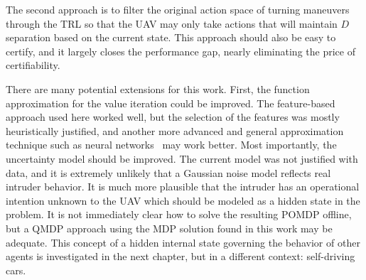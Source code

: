 The second approach is to filter the original action space of turning maneuvers through the TRL so that the UAV may only take actions that will maintain $D$ separation based on the current state.
This approach should also be easy to certify, and it largely closes the performance gap, nearly eliminating the price of certifiability.

There are many potential extensions for this work.
First, the function approximation for the value iteration could be improved.
The feature-based approach used here worked well, but the selection of the features was mostly heuristically justified, and another more advanced and general approximation technique such as neural networks~\cite{goodfellow2016deep} may work better.
Most importantly, the uncertainty model should be improved.
The current model was not justified with data, and it is extremely unlikely that a Gaussian noise model reflects real intruder behavior.
It is much more plausible that the intruder has an operational intention unknown to the UAV which should be modeled as a hidden state in the problem.
It is not immediately clear how to solve the resulting POMDP offline, but a QMDP approach using the MDP solution found in this work may be adequate.
This concept of a hidden internal state governing the behavior of other agents is investigated in the next chapter, but in a different context: self-driving cars.
